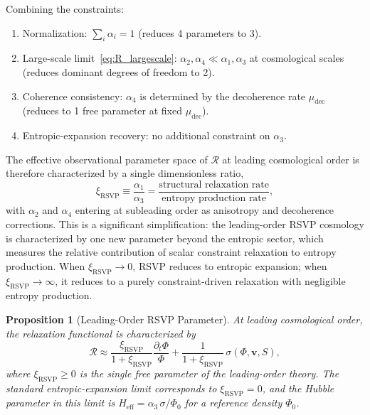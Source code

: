 \documentclass[12pt,a4paper]{article}
\newtheorem{proposition}[theorem]{Proposition}
\theoremstyle{remark}
\newcommand{\vv}{\mathbf{v}}
\newcommand{\Rcal}{\mathcal{R}}
\begin{document}
Combining the constraints:
\begin{enumerate}[leftmargin=2em]
\item Normalization: $\sum_i \alpha_i = 1$ (reduces 4 parameters to 3).
\item Large-scale limit~\eqref{eq:R_largescale}: $\alpha_2, \alpha_4 \ll \alpha_1, \alpha_3$
  at cosmological scales (reduces dominant degrees of freedom to 2).
\item Coherence consistency: $\alpha_4$ is determined by the decoherence rate
  $\mu_{\mathrm{dec}}$ (reduces to 1 free parameter at fixed $\mu_{\mathrm{dec}}$).
\item Entropic-expansion recovery: no additional constraint on $\alpha_3$.
\end{enumerate}
The effective observational parameter space of $\Rcal$ at leading cosmological
order is therefore characterized by a single dimensionless ratio,
\begin{equation}
\boxed{\xi_{\mathrm{RSVP}} \equiv \frac{\alpha_1}{\alpha_3}
= \frac{\text{structural relaxation rate}}{\text{entropy production rate}},}
\label{eq:xi_ratio}
\end{equation}
with $\alpha_2$ and $\alpha_4$ entering at subleading order as anisotropy and
decoherence corrections. This is a significant simplification: the leading-order
RSVP cosmology is characterized by one new parameter beyond the entropic sector,
which measures the relative contribution of scalar constraint relaxation to
entropy production. When $\xi_{\mathrm{RSVP}} \to 0$, RSVP reduces to entropic
expansion; when $\xi_{\mathrm{RSVP}} \to \infty$, it reduces to a purely
constraint-driven relaxation with negligible entropy production.

\begin{proposition}[Leading-Order RSVP Parameter]
At leading cosmological order, the relaxation functional is characterized by
\begin{equation}
\Rcal \approx \frac{\xi_{\mathrm{RSVP}}}{1+\xi_{\mathrm{RSVP}}}
\frac{\partial_t\Phi}{\Phi}
+ \frac{1}{1+\xi_{\mathrm{RSVP}}}\,\sigma(\Phi,\vv,S),
\end{equation}
where $\xi_{\mathrm{RSVP}} \ge 0$ is the single free parameter of the leading-order
theory. The standard entropic-expansion limit corresponds to $\xi_{\mathrm{RSVP}} = 0$,
and the Hubble parameter in this limit is $H_{\mathrm{eff}} = \alpha_3\,\sigma/\Phi_0$
for a reference density $\Phi_0$.
\end{proposition}

\appendix
\end{document}
